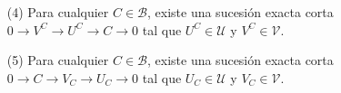 \documentclass[preview]{standalone}
\begin{document}
\begin{center}
\begin{itemize} \item[(4)] Para cualquier $C\in\mathscr{B}$, existe una sucesión exacta corta $0\to V^C\to U^C\to C\to 0$ tal que $U^C\in\mathcal{U}$ y $V^C\in\mathcal{V}$. \item[(5)] Para cualquier $C\in\mathscr{B}$, existe una sucesión exacta corta $0\to C\to V_C\to U_C\to 0$ tal que $U_C\in\mathcal{U}$ y $V_C\in\mathcal{V}$. \end{itemize}
\end{center}
\end{document}

